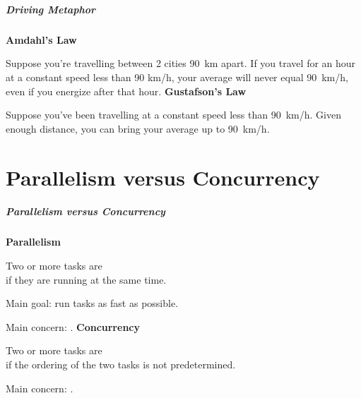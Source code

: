 \documentclass[aspectratio=43]{beamer}
\newenvironment{changemargin}[1]{%
  \begin{list}{}{%
    \setlength{\topsep}{0pt}%
    \setlength{\leftmargin}{#1}%
    \setlength{\rightmargin}{1em}
    \setlength{\listparindent}{\parindent}%
    \setlength{\itemindent}{\parindent}%
    \setlength{\parsep}{\parskip}%
  }%
  \item[]}{\end{list}}
\begin{document}
\section{}
\begin{frame}
  \frametitle{Driving Metaphor}

  {\bf Amdahl's Law}
  
  Suppose you're travelling between 2 cities 90~km apart. If you travel for an
  hour at a constant speed less than 90 km/h, your average will never equal
  90~km/h, even if you energize after that hour.
  \vfill
  {\bf Gustafson's Law}

  Suppose you've been travelling at a constant speed less than 90~km/h. Given
  enough distance, you can bring your average up to 90~km/h.
\end{frame}


\part{Parallelism versus Concurrency}
\begin{frame}
 
  \partpage
\end{frame}

\begin{frame}
  \frametitle{Parallelism versus Concurrency}

\begin{changemargin}{2cm}
  {\bf Parallelism}

  Two or more tasks are \\ \hspace*{2em} if they are running at the same time. 

  Main goal: run tasks as fast as possible. 

  Main concern: .
  \vfill
  {\bf Concurrency}

  Two or more tasks are \\ \hspace*{2em} if the ordering of the two tasks is not 
  predetermined. 

  Main concern: .
\end{changemargin}

\end{frame}
\end{document}
